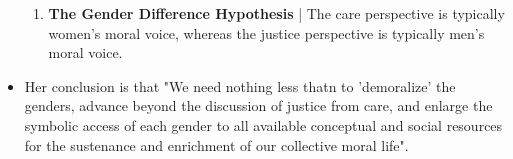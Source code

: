 \documentclass{article}
\begin{document}
\begin{itemize}
\begin{enumerate}
            \item \textbf{The Gender Difference Hypothesis} | The care perspective is typically women's moral voice, whereas the justice perspective is typically men's moral voice.
        \end{enumerate}
        \item Her conclusion is that "We need nothing less thatn to 'demoralize' the genders, advance beyond the discussion of justice from care, and enlarge the symbolic access of each gender to all available conceptual and social resources for the sustenance and enrichment of our collective moral life".
    \end{itemize}
\end{document}
